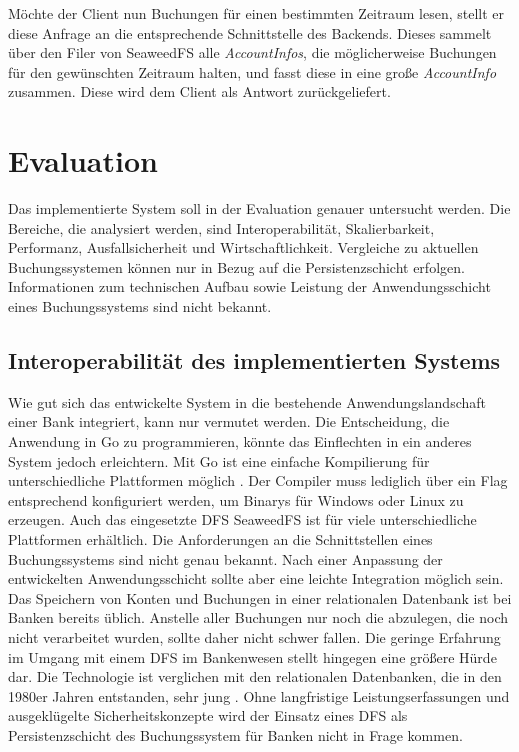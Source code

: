 \documentclass[12pt,oneside,a4paper,parskip]{scrbook}
\begin{document}
Möchte der Client nun Buchungen für einen bestimmten Zeitraum lesen, stellt er diese Anfrage an die entsprechende Schnittstelle des Backends. Dieses sammelt über den Filer von SeaweedFS alle \textit{AccountInfos}, die möglicherweise Buchungen für den gewünschten Zeitraum halten, und fasst diese in eine große \textit{AccountInfo} zusammen. Diese wird dem Client als Antwort zurückgeliefert.

\cleardoublepage
\chapter{Evaluation}
\label{evaluation}
Das implementierte System soll in der Evaluation genauer untersucht werden. Die Bereiche, die analysiert werden, sind Interoperabilität, Skalierbarkeit, Performanz, Ausfallsicherheit und Wirtschaftlichkeit. Vergleiche zu aktuellen Buchungssystemen können nur in Bezug auf die Persistenzschicht erfolgen. Informationen zum technischen Aufbau sowie Leistung der Anwendungsschicht eines Buchungssystems sind nicht bekannt. 

\section{Interoperabilität des implementierten Systems}
Wie gut sich das entwickelte System in die bestehende Anwendungslandschaft einer Bank integriert, kann nur vermutet werden. Die Entscheidung, die Anwendung in Go zu programmieren, könnte das Einflechten in ein anderes System jedoch erleichtern. Mit Go ist eine einfache Kompilierung für unterschiedliche Plattformen möglich \cite{goCompile}. Der Compiler muss lediglich über ein Flag entsprechend konfiguriert werden, um Binarys für Windows oder Linux zu erzeugen. Auch das eingesetzte DFS SeaweedFS ist für viele unterschiedliche Plattformen erhältlich. Die Anforderungen an die Schnittstellen eines Buchungssystems sind nicht genau bekannt. Nach einer Anpassung der entwickelten Anwendungsschicht sollte aber eine leichte Integration möglich sein. Das Speichern von Konten und Buchungen in einer relationalen Datenbank ist bei Banken bereits üblich. Anstelle aller Buchungen nur noch die abzulegen, die noch nicht verarbeitet wurden, sollte daher nicht schwer fallen. Die geringe Erfahrung im Umgang mit einem DFS im Bankenwesen stellt hingegen eine größere Hürde dar. Die Technologie ist verglichen mit den relationalen Datenbanken, die in den 1980er Jahren entstanden, sehr jung \cite{wiki:datenbankGeschichte}. Ohne langfristige Leistungserfassungen und ausgeklügelte Sicherheitskonzepte wird der Einsatz eines DFS als Persistenzschicht des Buchungssystem für Banken nicht in Frage kommen.
\end{document}

